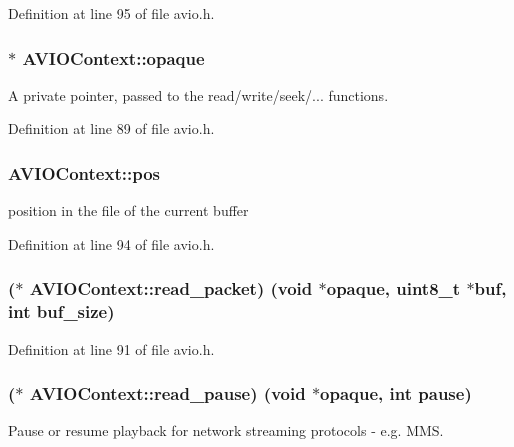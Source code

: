 Definition at line 95 of file avio.\+h.

\subsubsection[{\texorpdfstring{opaque}{opaque}}]{$\ast$ A\+V\+I\+O\+Context\+::opaque}\hypertarget{struct_a_v_i_o_context_afa97c079a10a48588f7b55f9dfff1e47}{}\label{struct_a_v_i_o_context_afa97c079a10a48588f7b55f9dfff1e47}
A private pointer, passed to the read/write/seek/... functions. 

Definition at line 89 of file avio.\+h.

\subsubsection[{\texorpdfstring{pos}{pos}}]{ A\+V\+I\+O\+Context\+::pos}\hypertarget{struct_a_v_i_o_context_a7158ec9b44d75704ea5c2fa5ac28fd50}{}\label{struct_a_v_i_o_context_a7158ec9b44d75704ea5c2fa5ac28fd50}
position in the file of the current buffer 

Definition at line 94 of file avio.\+h.

\subsubsection[{\texorpdfstring{read\+\_\+packet}{read_packet}}]{($\ast$ A\+V\+I\+O\+Context\+::read\+\_\+packet) ({\bf void} $\ast${\bf opaque}, {\bf uint8\+\_\+t} $\ast${\bf buf}, {\bf int} buf\+\_\+size)}\hypertarget{struct_a_v_i_o_context_a9be0423e0c66d11d8e0ace043e3aec08}{}\label{struct_a_v_i_o_context_a9be0423e0c66d11d8e0ace043e3aec08}


Definition at line 91 of file avio.\+h.

\subsubsection[{\texorpdfstring{read\+\_\+pause}{read_pause}}]{($\ast$ A\+V\+I\+O\+Context\+::read\+\_\+pause) ({\bf void} $\ast${\bf opaque}, {\bf int} {\bf pause})}\hypertarget{struct_a_v_i_o_context_ae3658a91428df0cfa2b834f6bd7d7bd4}{}\label{struct_a_v_i_o_context_ae3658a91428df0cfa2b834f6bd7d7bd4}
Pause or resume playback for network streaming protocols -\/ e.\+g. M\+MS. 


